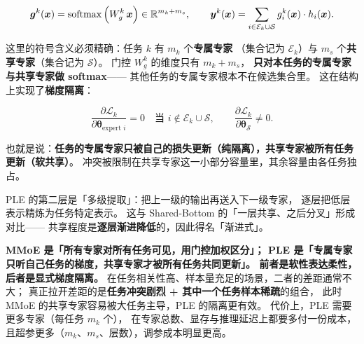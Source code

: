 \begin{equation}
\bm{g}^k(\bm{x}) = \operatorname{softmax}\Big( W_g^k \, \bm{x} \Big) \in \mathbb{R}^{m_k + m_s},
\qquad
\bm{y}^k(\bm{x}) = \sum_{i \in \mathcal{E}_k \cup \mathcal{S}} g_i^k(\bm{x}) \cdot h_i(\bm{x}) .
\label{eq:cgc}
\end{equation}

这里的符号含义必须精确：任务 $k$ 有 $m_k$ 个\textbf{专属专家}
（集合记为 $\mathcal{E}_k$）与 $m_s$ 个\textbf{共享专家}（集合记为 $\mathcal{S}$）。
门控 $W_g^k$ 的维度只有 $m_k + m_s$，
\textbf{只对本任务的专属专家与共享专家做 softmax}——
其他任务的专属专家根本不在候选集合里。
这在结构上实现了\textbf{梯度隔离}：

\begin{equation}
\frac{\partial \mathcal{L}_k}{\partial \bm{\theta}_{\text{expert } i}} = 0
\quad \text{当 } i \notin \mathcal{E}_k \cup \mathcal{S},
\qquad
\frac{\partial \mathcal{L}_k}{\partial \bm{\theta}_{\mathcal{S}}} \ne 0 .
\label{eq:ple-isolation}
\end{equation}

也就是说：\textbf{任务的专属专家只被自己的损失更新（纯隔离），共享专家被所有任务更新（软共享）}。
冲突被限制在共享专家这一小部分容量里，其余容量由各任务独占。

PLE 的第二层是「多级提取」：把上一级的输出再送入下一级专家，
逐层把低层表示精炼为任务特定表示。
这与 Shared-Bottom 的「一层共享、之后分叉」形成对比——
共享程度是\textbf{逐层渐进降低}的，因此得名「渐进式」。

\begin{keypoint}
\textbf{MMoE 是「所有专家对所有任务可见，用门控加权区分」；
PLE 是「专属专家只听自己任务的梯度，共享专家才被所有任务共同更新」。
前者是软性表达柔性，后者是显式梯度隔离。}
在任务相关性高、样本量充足的场景，二者的差距通常不大；
真正拉开差距的是\textbf{任务冲突剧烈 + 其中一个任务样本稀疏}的组合，
此时 MMoE 的共享专家容易被大任务主导，PLE 的隔离更有效。
代价上，PLE 需要更多专家（每任务 $m_k$ 个），
在专家总数、显存与推理延迟上都要多付一份成本，
且超参更多（$m_k$、$m_s$、层数），调参成本明显更高。
\end{keypoint}


